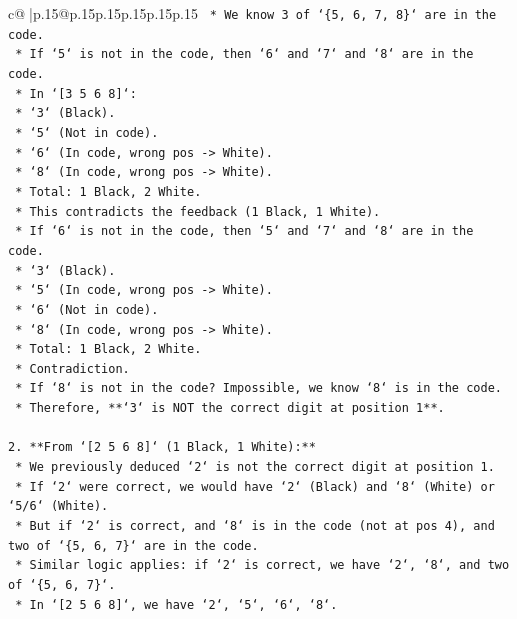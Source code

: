 \documentclass{article}
\begin{document}
{\begin{supertabular}{c@{$\;$}|p{.15\linewidth}@{}p{.15\linewidth}p{.15\linewidth}p{.15\linewidth}p{.15\linewidth}p{.15\linewidth}}
{{{\texttt{        *   We know 3 of `\{5, 6, 7, 8\}` are in the code.} \\
\texttt{        *   If `5` is not in the code, then `6` and `7` and `8` are in the code.} \\
\texttt{        *   In `{[}3 5 6 8{]}`:} \\
\texttt{            *   `3` (Black).} \\
\texttt{            *   `5` (Not in code).} \\
\texttt{            *   `6` (In code, wrong pos {-}> White).} \\
\texttt{            *   `8` (In code, wrong pos {-}> White).} \\
\texttt{            *   Total: 1 Black, 2 White.} \\
\texttt{            *   This contradicts the feedback (1 Black, 1 White).} \\
\texttt{        *   If `6` is not in the code, then `5` and `7` and `8` are in the code.} \\
\texttt{            *   `3` (Black).} \\
\texttt{            *   `5` (In code, wrong pos {-}> White).} \\
\texttt{            *   `6` (Not in code).} \\
\texttt{            *   `8` (In code, wrong pos {-}> White).} \\
\texttt{            *   Total: 1 Black, 2 White.} \\
\texttt{            *   Contradiction.} \\
\texttt{        *   If `8` is not in the code? Impossible, we know `8` is in the code.} \\
\texttt{        *   Therefore, **`3` is NOT the correct digit at position 1**.} \\
\\ 
\texttt{2.  **From `{[}2 5 6 8{]}` (1 Black, 1 White):**} \\
\texttt{    *   We previously deduced `2` is not the correct digit at position 1.} \\
\texttt{    *   If `2` were correct, we would have `2` (Black) and `8` (White) or `5/6` (White).} \\
\texttt{    *   But if `2` is correct, and `8` is in the code (not at pos 4), and two of `\{5, 6, 7\}` are in the code.} \\
\texttt{    *   Similar logic applies: if `2` is correct, we have `2`, `8`, and two of `\{5, 6, 7\}`.} \\
\texttt{    *   In `{[}2 5 6 8{]}`, we have `2`, `5`, `6`, `8`.} \\
}}}
\end{supertabular}}
\end{document}
